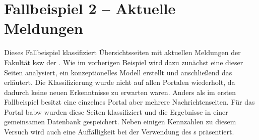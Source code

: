 \section{Fallbeispiel 2 -- Aktuelle Meldungen}
    Dieses Fallbeispiel klassifiziert Übersichtsseiten mit aktuellen
    Meldungen der Fakultät \gls{ksw} der {\fernUni}.
    Wie im vorherigen Beispiel wird dazu zunächst eine dieser Seiten analysiert,
    ein konzeptionelles Modell erstellt
    und anschließend das {\classificationModel} erläutert.
    Die Klassifizierung wurde nicht auf allen Portalen wiederholt,
    da dadurch keine neuen Erkenntnisse zu erwarten waren.
    Anders als im ersten Fallbeispiel besitzt eine einzelnes Portal aber
    mehrere Nachrichtenseiten.
    Für das Portal \gls{babw} wurden diese Seiten klassifiziert und die Ergebnisse in einer gemeinsamen Datenbank gespeichert.
    Neben einigen Kennzahlen zu diesem Versuch wird auch eine Auffälligkeit bei der Verwendung des {\wordpressCrawler}s präsentiert.

    
    
    
    
